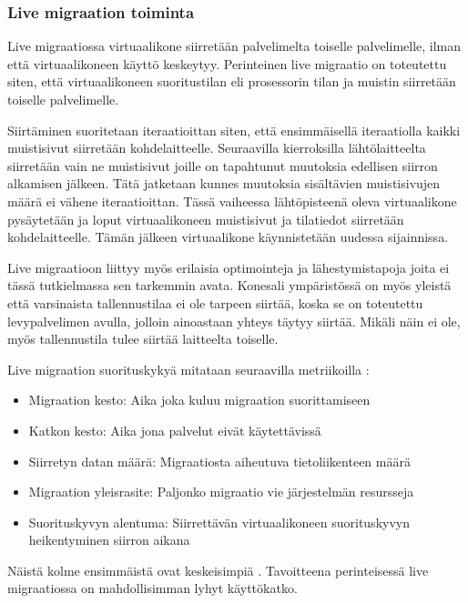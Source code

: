 \subsubsection*{Live migraation toiminta}%
Live migraatiossa virtuaalikone siirretään palvelimelta toiselle palvelimelle, ilman että virtuaalikoneen käyttö keskeytyy. 
Perinteinen live migraatio on toteutettu siten, että virtuaalikoneen suoritustilan eli prosessorin tilan ja muistin siirretään toiselle palvelimelle.

Siirtäminen suoritetaan iteraatioittan siten, että ensimmäisellä iteraatiolla kaikki muistisivut siirretään kohdelaitteelle.
Seuraavilla kierroksilla lähtölaitteelta siirretään vain ne muistisivut joille on tapahtunut muutoksia edellisen siirron alkamisen jälkeen. 
Tätä jatketaan kunnes muutoksia sisältävien muistisivujen määrä ei vähene iteraatioittan.
Tässä vaiheessa lähtöpisteenä oleva virtuaalikone pysäytetään ja loput virtuaalikoneen muistisivut ja tilatiedot siirretään kohdelaitteelle. Tämän jälkeen virtuaalikone käynnistetään uudessa sijainnissa. 

Live migraatioon liittyy myös erilaisia optimointeja ja lähestymistapoja joita ei tässä tutkielmassa sen tarkemmin avata. 
Konesali ympäristössä on myös yleistä että varsinaista tallennustilaa ei ole tarpeen siirtää, koska se on toteutettu levypalvelimen avulla, jolloin ainoastaan yhteys täytyy siirtää. Mikäli näin ei ole, myös tallennustila tulee siirtää laitteelta toiselle.

Live migraation suorituskykyä mitataan seuraavilla metriikoilla \cite{soni2013comparative}:

\begin{itemize}
	\item Migraation kesto: Aika joka kuluu migraation suorittamiseen
	\item Katkon kesto: Aika jona palvelut eivät käytettävissä
	\item Siirretyn datan määrä: Migraatiosta aiheutuva tietoliikenteen määrä
	\item Migraation yleisrasite: Paljonko migraatio vie järjestelmän resursseja
	\item Suorituskyvyn alentuma: Siirrettävän virtuaalikoneen suorituskyvyn heikentyminen siirron aikana
\end{itemize}

Näistä kolme ensimmäistä ovat keskeisimpiä \cite{farris2017lightweight}. Tavoitteena perinteisessä live migraatiossa on mahdollisimman lyhyt käyttökatko. \cite{ha2015adaptive}


